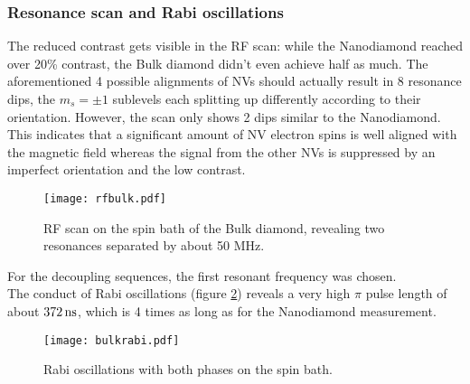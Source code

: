 \documentclass[12pt,a4paper]{article}
\begin{document}
\subsubsection{Resonance scan and Rabi oscillations}
The reduced contrast gets visible in the RF scan: while the Nanodiamond reached over 20\% contrast, the Bulk diamond didn't even achieve half as much. The aforementioned 4 possible alignments of NVs should actually result in 8 resonance dips, the $m_s=\pm1$ sublevels each splitting up differently according to their orientation. However, the scan only shows 2 dips similar to the Nanodiamond. This indicates that a significant amount of NV electron spins is well aligned with the magnetic field whereas the signal from the other NVs is suppressed by an imperfect orientation and the low contrast.\\
\begin{figure}[H]
\texttt{[image: rfbulk.pdf]} 
\caption{RF scan on the spin bath of the Bulk diamond, revealing two resonances separated by about 50 MHz.}
\label{rfb}
\end{figure}
For the decoupling sequences, the first resonant frequency was chosen.
\\
The conduct of Rabi oscillations (figure \ref{br}) reveals a very high $\pi$ pulse length of about $\unit[372]{ns}$, which is 4 times as long as for the Nanodiamond measurement.\\
\begin{figure}[H]
\texttt{[image: bulkrabi.pdf]} 
\caption{Rabi oscillations with both phases on the spin bath.}
\label{br}
\end{figure} 
\end{document}
